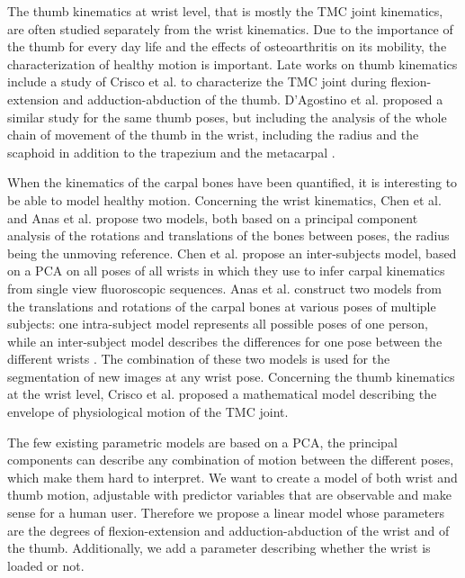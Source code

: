 The thumb kinematics at wrist level, that is mostly the TMC joint kinematics, are often studied separately from the wrist kinematics. Due to the importance of the thumb for every day life and the effects of osteoarthritis on its mobility, the characterization of healthy motion is important. Late works on thumb kinematics include a study of Crisco et al. \cite{crisco_2015_vivo} to characterize the TMC joint during flexion-extension and adduction-abduction of the thumb. D'Agostino et al. proposed a similar study for the same thumb poses, but including the analysis of the whole chain of movement of the thumb in the wrist, including the radius and the scaphoid in addition to the trapezium and the \first* metacarpal \cite{dagostino_2017_vivo}. 

When the kinematics of the carpal bones have been quantified, it is interesting to be able to model healthy motion. Concerning the wrist kinematics, Chen et al. \cite{chen_2011_inferring, chen_2012_automatic} and Anas et al. \cite{anas_2014_statistical, anas_2016_automatic} propose two models, both based on a principal component analysis of the rotations and translations of the bones between poses, the radius being the unmoving reference. Chen et al. propose an inter-subjects model, based on a PCA on all poses of all wrists in \cite{chen_2011_inferring, chen_2012_automatic} which they use to infer carpal kinematics from single view fluoroscopic sequences. Anas et al. construct two models from the translations and rotations of the carpal bones at various poses of multiple subjects: one intra-subject model represents all possible poses of one person, while an inter-subject model describes the differences for one pose between the different wrists \cite{anas_2014_statistical, anas_2016_automatic}. The combination of these two models is used for the segmentation of new images at any wrist pose. 
Concerning the thumb kinematics at the wrist level, Crisco et al. \cite{crisco_2015_envelope} proposed a mathematical model describing the envelope of physiological motion of the TMC joint. 

The few existing parametric models are based on a PCA, the principal components can describe any combination of motion between the different poses, which make them hard to interpret. We want to create a model of both wrist and thumb motion, adjustable with predictor variables that are observable and make sense for a human user. Therefore we propose a linear model whose parameters are the degrees of flexion-extension and adduction-abduction of the wrist and of the thumb. Additionally, we add a parameter describing whether the wrist is loaded or not. 


